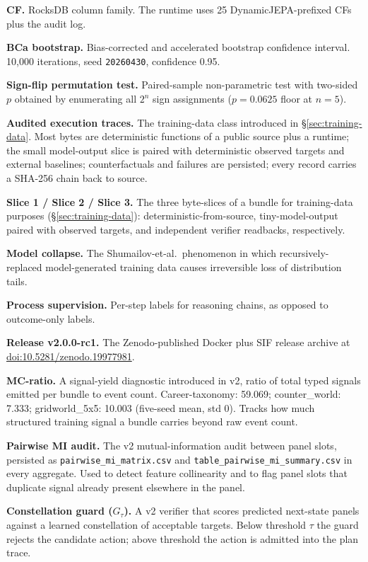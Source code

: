 \documentclass[10pt,twocolumn,letterpaper]{article}
\newcommand{\code}[1]{\texttt{\small #1}}
\begin{document}
\textbf{CF.} RocksDB column family. The runtime uses 25
DynamicJEPA-prefixed CFs plus the audit log.

\textbf{BCa bootstrap.} Bias-corrected and accelerated bootstrap
confidence interval. 10{,}000 iterations, seed \code{20260430},
confidence 0.95.

\textbf{Sign-flip permutation test.} Paired-sample non-parametric
test with two-sided $p$ obtained by enumerating all $2^n$ sign
assignments ($p = 0.0625$ floor at $n=5$).

\textbf{Audited execution traces.} The training-data class
introduced in \S\ref{sec:training-data}. Most bytes are
deterministic functions of a public source plus a runtime; the
small model-output slice is paired with deterministic observed
targets and external baselines; counterfactuals and failures are
persisted; every record carries a SHA-256 chain back to source.

\textbf{Slice 1 / Slice 2 / Slice 3.} The three byte-slices of a
bundle for training-data purposes (\S\ref{sec:training-data}):
deterministic-from-source, tiny-model-output paired with observed
targets, and independent verifier readbacks, respectively.

\textbf{Model collapse.} The Shumailov-et-al.\ phenomenon in which
recursively-replaced model-generated training data causes
irreversible loss of distribution tails.

\textbf{Process supervision.} Per-step labels for reasoning
chains, as opposed to outcome-only labels.

\textbf{Release v2.0.0-rc1.} The Zenodo-published Docker plus SIF
release archive at
\href{https://doi.org/10.5281/zenodo.19977981}{doi:10.5281/zenodo.19977981}.

\textbf{MC-ratio.} A signal-yield diagnostic introduced in v2,
ratio of total typed signals emitted per bundle to event count.
Career-taxonomy: 59.069; counter\_world: 7.333; gridworld\_5x5:
10.003 (five-seed mean, std 0). Tracks how much structured
training signal a bundle carries beyond raw event count.

\textbf{Pairwise MI audit.} The v2 mutual-information audit between
panel slots, persisted as \code{pairwise\_mi\_matrix.csv} and
\code{table\_pairwise\_mi\_summary.csv} in every aggregate. Used
to detect feature collinearity and to flag panel slots that
duplicate signal already present elsewhere in the panel.

\textbf{Constellation guard ($G_\tau$).} A v2 verifier that scores
predicted next-state panels against a learned constellation of
acceptable targets. Below threshold $\tau$ the guard rejects the
candidate action; above threshold the action is admitted into the
plan trace.
\end{document}

